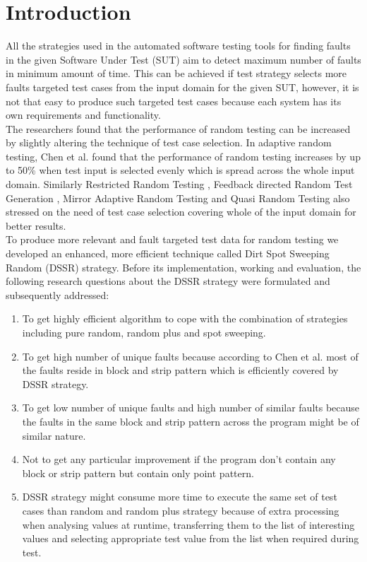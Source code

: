\documentclass[conference]{IEEEtran}
\begin{document}
\section{Introduction}
All the strategies used in the automated software testing tools for finding faults in the given Software Under Test (SUT) aim to detect maximum number of faults in minimum amount of time. This can be achieved if test strategy selects more faults targeted test cases from the input domain for the given SUT, however, it is not that easy to produce such targeted test cases because each system has its own requirements and functionality.\\
\indent The researchers \cite{Chen2008} found that the performance of random testing can be increased by slightly altering the technique of test case selection. In adaptive random testing, Chen et al.  \cite{Chen2008} found that the performance of random testing increases by up to 50\% when test input is selected evenly which is spread across the whole input domain. Similarly Restricted Random Testing \cite{Chan2002}, Feedback directed Random Test Generation \cite{Pacheco2007a}, Mirror Adaptive Random Testing \cite{Chen2003} and Quasi Random Testing \cite{Chen2005} also stressed on the need of test case selection covering whole of the input domain for better results.\\
\indent To produce more relevant and fault targeted test data for random testing we developed an enhanced, more efficient technique called Dirt Spot Sweeping Random (DSSR) strategy.  Before its implementation, working and evaluation, the following research questions about the DSSR strategy were formulated and subsequently addressed:
\begin{enumerate}

\item To get highly efficient algorithm to cope with the combination of strategies including pure random, random plus and spot sweeping.

\item To get high number of unique faults because according to Chen et al. \cite{Chen2006} most of the faults reside in block and strip pattern which is efficiently covered by DSSR strategy. 

\item To get  low number of unique faults and high number of similar faults because the faults in the same block and strip pattern across the program might be of similar nature.

\item  Not to get any particular improvement if the program don't contain any block or strip pattern but contain only point pattern.

\item  DSSR strategy might consume more time to execute the same set of test cases than random and random plus strategy because of extra processing when analysing values at runtime, transferring them to the list of interesting values and selecting appropriate test value from the list when required during test.

\end{enumerate}
\end{document}
